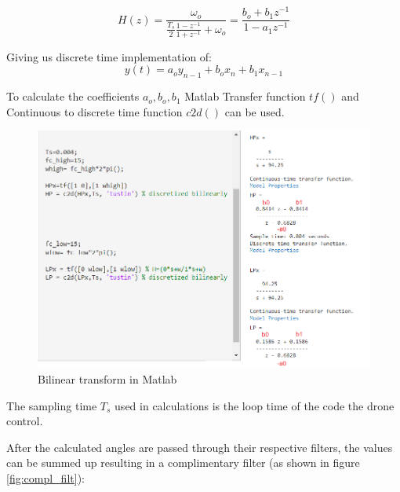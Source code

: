 \begin{displaymath}
    H(z)= \frac{\omega _o}{\frac{T_s}{2}\frac{1-z^{-1}}{1+z^{-1}} + \omega _o}=\frac{b_o + b_1z^{-1}}{1-a_1z^{-1}}
\end{displaymath}

Giving us discrete time implementation of:  
\begin{displaymath}
    y(t)=a_o y_{n-1}+b_ox_n+b_1x_{n-1}
\end{displaymath}

To calculate the coefficients $a_o, b_o, b_1$ Matlab Transfer function $tf()$ and Continuous to discrete time function $c2d() $  can be used.


\begin{figure}[H]
    \begin{center}
    \includegraphics[scale = 0.5]{pictures/IMU/filters_matlab.png}
    \end{center}
    \caption{Bilinear transform in Matlab}
    \label{fig:my_label}
\end{figure}



The sampling time $T_s$ used in calculations is the loop time of the code the drone control.


After the calculated angles are passed through their respective filters, the values can be summed up resulting in a complimentary filter (as shown in figure \ref{fig:compl_filt}):



